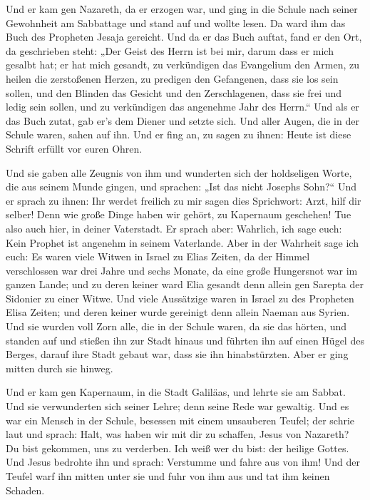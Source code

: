  Und er kam gen Nazareth, da er erzogen war, und ging in
die Schule nach seiner Gewohnheit am Sabbattage und stand auf und wollte
lesen.  Da ward ihm das Buch des Propheten Jesaja
gereicht. Und da er das Buch auftat, fand er den Ort, da geschrieben
steht:  „Der Geist des Herrn ist bei mir, darum dass er
mich gesalbt hat; er hat mich gesandt, zu verkündigen das Evangelium den
Armen, zu heilen die zerstoßenen Herzen, zu predigen den Gefangenen,
dass sie los sein sollen, und den Blinden das Gesicht und den
Zerschlagenen, dass sie frei und ledig sein sollen,  und
zu verkündigen das angenehme Jahr des Herrn.``  Und als
er das Buch zutat, gab er's dem Diener und setzte sich. Und aller Augen,
die in der Schule waren, sahen auf ihn.  Und er fing an,
zu sagen zu ihnen: Heute ist diese Schrift erfüllt vor euren Ohren.

 Und sie gaben alle Zeugnis von ihm und wunderten sich
der holdseligen Worte, die aus seinem Munde gingen, und sprachen: „Ist
das nicht Josephs Sohn?{}``  Und er sprach zu ihnen: Ihr
werdet freilich zu mir sagen dies Sprichwort: Arzt, hilf dir selber!
Denn wie große Dinge haben wir gehört, zu Kapernaum geschehen! Tue also
auch hier, in deiner Vaterstadt.  Er sprach aber:
Wahrlich, ich sage euch: Kein Prophet ist angenehm in seinem Vaterlande.
 Aber in der Wahrheit sage ich euch: Es waren viele
Witwen in Israel zu Elias Zeiten, da der Himmel verschlossen war drei
Jahre und sechs Monate, da eine große Hungersnot war im ganzen Lande;
 und zu deren keiner ward Elia gesandt denn allein gen
Sarepta der Sidonier zu einer Witwe.  Und viele
Aussätzige waren in Israel zu des Propheten Elisa Zeiten; und deren
keiner wurde gereinigt denn allein Naeman aus Syrien. 
Und sie wurden voll Zorn alle, die in der Schule waren, da sie das
hörten,  und standen auf und stießen ihn zur Stadt hinaus
und führten ihn auf einen Hügel des Berges, darauf ihre Stadt gebaut
war, dass sie ihn hinabstürzten.  Aber er ging mitten
durch sie hinweg.

 Und er kam gen Kapernaum, in die Stadt Galiläas, und
lehrte sie am Sabbat.  Und sie verwunderten sich seiner
Lehre; denn seine Rede war gewaltig.  Und es war ein
Mensch in der Schule, besessen mit einem unsauberen Teufel; der schrie
laut  und sprach: Halt, was haben wir mit dir zu
schaffen, Jesus von Nazareth? Du bist gekommen, uns zu verderben. Ich
weiß wer du bist: der heilige Gottes.  Und Jesus bedrohte
ihn und sprach: Verstumme und fahre aus von ihm! Und der Teufel warf ihn
mitten unter sie und fuhr von ihm aus und tat ihm keinen Schaden.

